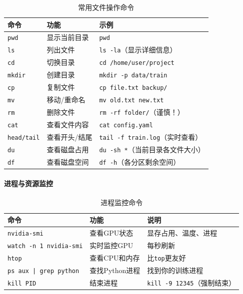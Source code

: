 \begin{table}[H]
\centering
\small
\renewcommand{\arraystretch}{1.3}
\begin{tabular}{l|l|l}
\toprule
\textbf{命令} & \textbf{功能} & \textbf{示例} \\
\midrule
\texttt{pwd} & 显示当前目录 & \texttt{pwd} \\
\texttt{ls} & 列出文件 & \texttt{ls -la}（显示详细信息） \\
\texttt{cd} & 切换目录 & \texttt{cd /home/user/project} \\
\texttt{mkdir} & 创建目录 & \texttt{mkdir -p data/train} \\
\texttt{cp} & 复制文件 & \texttt{cp file.txt backup/} \\
\texttt{mv} & 移动/重命名 & \texttt{mv old.txt new.txt} \\
\texttt{rm} & 删除文件 & \texttt{rm -rf folder/}（谨慎！） \\
\texttt{cat} & 查看文件内容 & \texttt{cat config.yaml} \\
\texttt{head/tail} & 查看开头/结尾 & \texttt{tail -f train.log}（实时查看） \\
\texttt{du} & 查看磁盘占用 & \texttt{du -sh *}（当前目录各文件大小） \\
\texttt{df} & 查看磁盘空间 & \texttt{df -h}（各分区剩余空间） \\
\bottomrule
\end{tabular}
\caption{常用文件操作命令}
\end{table}

\paragraph{进程与资源监控}\mbox{}\par\nopagebreak

\begin{table}[H]
\centering
\small
\renewcommand{\arraystretch}{1.3}
\begin{tabular}{l|l|l}
\toprule
\textbf{命令} & \textbf{功能} & \textbf{说明} \\
\midrule
\texttt{nvidia-smi} & 查看GPU状态 & 显存占用、温度、进程 \\
\texttt{watch -n 1 nvidia-smi} & 实时监控GPU & 每秒刷新 \\
\texttt{htop} & 查看CPU和内存 & 比\texttt{top}更友好 \\
\texttt{ps aux | grep python} & 查找Python进程 & 找到你的训练进程 \\
\texttt{kill PID} & 结束进程 & \texttt{kill -9 12345}（强制结束） \\
\bottomrule
\end{tabular}
\caption{进程监控命令}
\end{table}

